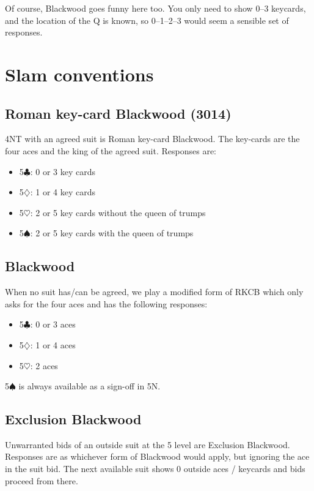\documentclass[a4paper,14pt]{extarticle}
\begin{document}
Of course, Blackwood goes funny here too.  You only need to show 0--3 keycards,
and the location of the Q is known, so 0--1--2--3 would seem a sensible set
of responses.

\newpage

\section{Slam conventions}
\label{sec:slam}

\subsection{Roman key-card Blackwood (3014)}
\label{sec:rkcb}

4NT with an agreed suit is Roman key-card Blackwood. The key-cards are the four aces
and the king of the agreed suit. Responses are:

\begin{itemize}
\item 5$\clubsuit$: 0 or 3 key cards
\item 5$\diamondsuit$: 1 or 4 key cards
\item 5$\heartsuit$: 2 or 5 key cards without the queen of trumps
\item 5$\spadesuit$: 2 or 5 key cards with the queen of trumps
\end{itemize}

\subsection{Blackwood}
\label{sec:blackwood}

When no suit has/can be agreed, we play a modified form of RKCB which only asks
for the four aces and has the following responses:

\begin{itemize}
\item 5$\clubsuit$: 0 or 3 aces
\item 5$\diamondsuit$: 1 or 4 aces
\item 5$\heartsuit$: 2 aces
\end{itemize}

5$\spadesuit$ is always available as a sign-off in 5N.

\subsection{Exclusion Blackwood}
\label{sec:exclusion}

Unwarranted bids of an outside suit at the 5 level are Exclusion Blackwood.
Responses are as whichever form of Blackwood would apply, but ignoring the ace
in the suit bid. The next available suit shows 0 outside aces / keycards and
bids proceed from there.
\end{document}
